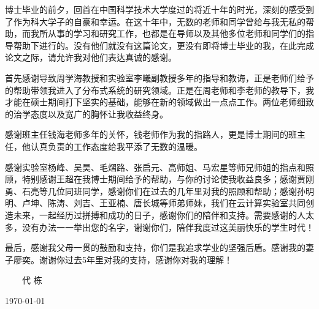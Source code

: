 
\begin{thanks}
博士毕业的前夕，回首在中国科学技术大学度过的将近十年的时光，深刻的感受到了作为科大学子的自豪和幸运。在这十年中，无数的老师和同学曾给与我无私的帮助，而我所从事的学习和研究工作，也都是在导师以及其他多位老师和同学们的指导帮助下进行的。没有他们就没有这篇论文，更没有即将博士毕业的我，在此完成论文之际，请允许我对他们表达真诚的感谢。

首先感谢导致周学海教授和实验室李曦副教授多年的指导和教诲，正是老师们给予的帮助带领我进入了分布式系统的研究领域。正是在周老师和李老师的教导下，我才能在硕士期间打下坚实的基础，能够在新的领域做出一点点工作。两位老师细致的治学态度以及宽广的胸怀让我收益终身。

感谢班主任钱海老师多年的关怀，钱老师作为我的指路人，更是博士期间的班主任，他认真负责的工作态度给我平添了无数的温暖。

感谢实验室杨峰、吴昊、毛熠路、张启元、高师姐、马宏星等师兄师姐的指点和照顾，特别感谢王超在我博士期间给予的帮助，与你的讨论使我收益良多；感谢贾刚勇、石亮等几位同班同学，感谢你们在过去的几年里对我的照顾和帮助；感谢孙明明、卢坤、陈涛、刘吉、王亚楠、唐长城等师弟师妹，我们在云计算实验室共同创造未来，一起经历过拼搏和成功的日子，感谢你们的陪伴和支持。需要感谢的人太多，没有办法一一举出您的名字，谢谢你们，陪伴我度过这美丽快乐的学生时代！

最后，感谢我父母一贯的鼓励和支持，你们是我追求学业的坚强后盾。感谢我的妻子廖奕。谢谢你过去5年里对我的支持，感谢你对我的理解！

\vskip 18pt

\begin{flushright}

~~~~代 栋~~~~

\today

\end{flushright}

\end{thanks}
